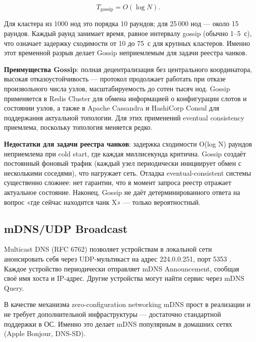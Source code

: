 \begin{equation}
T_{\mathrm{gossip}} = O(\log N).
\label{eq:gossip}
\end{equation}

Для кластера из 1000 нод это порядка 10 раундов; для 25\,000 нод --- около 15 раундов. Каждый раунд занимает время, равное интервалу gossip (обычно 1--5~с), что означает задержку сходимости от 10 до 75~с для крупных кластеров. Именно этот временной разрыв делает Gossip неприемлемым для задачи реестра чанков.

\textbf{Преимущества Gossip}: полная децентрализация без центрального координатора, высокая отказоустойчивость --- протокол продолжает работать при отказе произвольного числа узлов, масштабируемость до сотен тысяч нод. Gossip применяется в Redis Cluster для обмена информацией о конфигурации слотов и состоянии узлов, а также в Apache Cassandra и HashiCorp Consul для поддержания актуальной топологии. Для этих применений eventual consistency приемлема, поскольку топология меняется редко.

\textbf{Недостатки для задачи реестра чанков}: задержка сходимости O(log N) раундов неприемлема при cold start, где каждая миллисекунда критична. Gossip создаёт постоянный фоновый трафик (каждый узел периодически инициирует обмен с несколькими соседями), что нагружает сеть. Отладка eventual-consistent системы существенно сложнее: нет гарантии, что в момент запроса реестр отражает актуальное состояние. Наконец, Gossip не даёт детерминированного ответа на вопрос «где сейчас находится чанк X» --- только вероятностный.

\subsection*{mDNS/UDP Broadcast}

Multicast DNS (RFC 6762) позволяет устройствам в локальной сети анонсировать себя через UDP-мультикаст на адрес 224.0.0.251, порт 5353 \cite{mdns_k8s_limitations}. Каждое устройство периодически отправляет mDNS Announcement, сообщая своё имя хоста и IP-адрес. Другие устройства могут найти сервис через mDNS Query.

В качестве механизма zero-configuration networking mDNS прост в реализации и не требует дополнительной инфраструктуры --- достаточно стандартной поддержки в ОС. Именно это делает mDNS популярным в домашних сетях (Apple Bonjour, DNS-SD).

